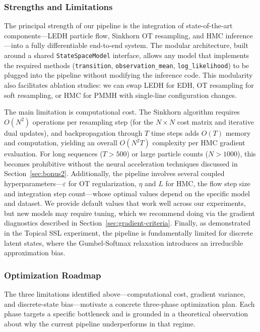 \documentclass[12pt,a4paper]{article}
\theoremstyle{definition}
\theoremstyle{remark}
\begin{document}
\subsubsection{Strengths and Limitations}

The principal strength of our pipeline is the integration of state-of-the-art components---LEDH particle flow, Sinkhorn OT resampling, and HMC inference---into a fully differentiable end-to-end system. The modular architecture, built around a shared \texttt{StateSpaceModel} interface, allows any model that implements the required methods (\texttt{transition}, \texttt{observation\_mean}, \texttt{log\_likelihood}) to be plugged into the pipeline without modifying the inference code. This modularity also facilitates ablation studies: we can swap LEDH for EDH, OT resampling for soft resampling, or HMC for PMMH with single-line configuration changes.

The main limitation is computational cost. The Sinkhorn algorithm requires $O(N^2)$ operations per resampling step (for the $N \times N$ cost matrix and iterative dual updates), and backpropagation through $T$ time steps adds $O(T)$ memory and computation, yielding an overall $O(N^2 T)$ complexity per HMC gradient evaluation. For long sequences ($T > 500$) or large particle counts ($N > 1000$), this becomes prohibitive without the neural acceleration techniques discussed in Section~\ref{sec:bonus2}. Additionally, the pipeline involves several coupled hyperparameters---$\varepsilon$ for OT regularization, $\eta$ and $L$ for HMC, the flow step size and integration step count---whose optimal values depend on the specific model and dataset. We provide default values that work well across our experiments, but new models may require tuning, which we recommend doing via the gradient diagnostics described in Section~\ref{sec:gradient-criteria}. Finally, as demonstrated in the Topical SSL experiment, the pipeline is fundamentally limited for discrete latent states, where the Gumbel-Softmax relaxation introduces an irreducible approximation bias.

\subsubsection{Optimization Roadmap}

The three limitations identified above---computational cost, gradient variance, and discrete-state bias---motivate a concrete three-phase optimization plan. Each phase targets a specific bottleneck and is grounded in a theoretical observation about why the current pipeline underperforms in that regime.
\end{document}
